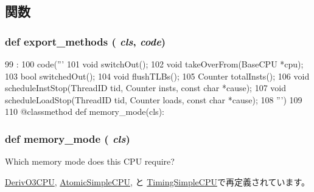 \subsection{関数}
\hypertarget{classBaseCPU_1_1BaseCPU_ab373c5eaef9a7b80491a097389260f4a}{
\subsubsection[{export\_\-methods}]{\setlength{\rightskip}{0pt plus 5cm}def export\_\-methods ( {\em cls}, \/   {\em code})}}
\label{classBaseCPU_1_1BaseCPU_ab373c5eaef9a7b80491a097389260f4a}



\begin{DoxyCode}
99                                  :
100         code('''
101     void switchOut();
102     void takeOverFrom(BaseCPU *cpu);
103     bool switchedOut();
104     void flushTLBs();
105     Counter totalInsts();
106     void scheduleInstStop(ThreadID tid, Counter insts, const char *cause);
107     void scheduleLoadStop(ThreadID tid, Counter loads, const char *cause);
108 ''')
109 
110     @classmethod
    def memory_mode(cls):
\end{DoxyCode}
\hypertarget{classBaseCPU_1_1BaseCPU_a53d73a2f804df6a1dcabb22052d09773}{
\subsubsection[{memory\_\-mode}]{\setlength{\rightskip}{0pt plus 5cm}def memory\_\-mode ( {\em cls})}}
\label{classBaseCPU_1_1BaseCPU_a53d73a2f804df6a1dcabb22052d09773}
\begin{DoxyVerb}Which memory mode does this CPU require?\end{DoxyVerb}
 

\hyperlink{classO3CPU_1_1DerivO3CPU_a53d73a2f804df6a1dcabb22052d09773}{DerivO3CPU}, \hyperlink{classAtomicSimpleCPU_1_1AtomicSimpleCPU_a53d73a2f804df6a1dcabb22052d09773}{AtomicSimpleCPU}, と \hyperlink{classTimingSimpleCPU_1_1TimingSimpleCPU_a53d73a2f804df6a1dcabb22052d09773}{TimingSimpleCPU}で再定義されています。


